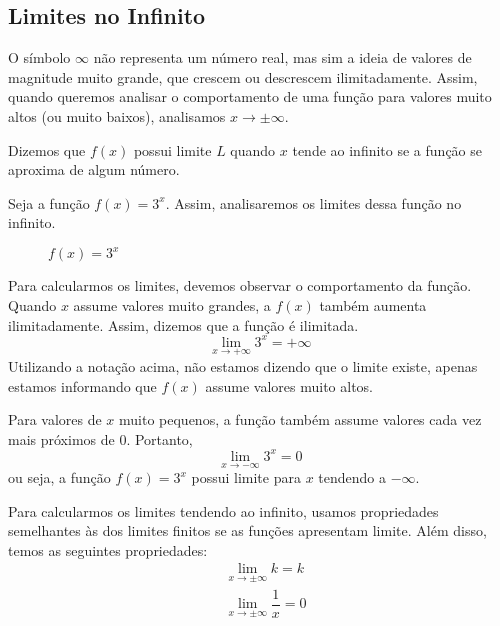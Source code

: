 \subsection{Limites no Infinito}
O símbolo $\infty$ não representa um número real, mas sim a ideia de valores de magnitude muito grande, que crescem ou descrescem ilimitadamente. Assim, quando queremos analisar o comportamento de uma função para valores muito altos (ou muito baixos), analisamos $x \rightarrow \pm \infty$. \par 
Dizemos que $f(x)$ possui limite $L$ quando $x$ tende ao infinito se a função se aproxima de algum número.
\begin{exemplo}
Seja a função $f(x)=3^x$. Assim, analisaremos os limites dessa função no infinito.
\begin{figure}[H]
	\centering
	\caption[Limites no Infinito]{$f(x)=3^x$}
\end{figure}
Para calcularmos os limites, devemos observar o comportamento da função. Quando $x$ assume valores muito grandes, a $f(x)$ também aumenta ilimitadamente. Assim, dizemos que a função é ilimitada.
\[\lim_{x\rightarrow + \infty}3^x = +\infty\]
Utilizando a notação acima, não estamos dizendo que o limite existe, apenas estamos informando que $f(x)$ assume valores muito altos. \par 
Para valores de $x$ muito pequenos, a função também assume valores cada vez mais próximos de $0$. Portanto,
\[\lim_{x\rightarrow - \infty}3^x = 0\]
ou seja, a função $f(x)=3^x$ possui limite para $x$ tendendo a $-\infty$.
\end{exemplo}
Para calcularmos os limites tendendo ao infinito, usamos propriedades semelhantes às dos limites finitos se as funções apresentam limite. Além disso, temos as seguintes propriedades:
\begin{align*}
&\lim_{x\rightarrow \pm \infty}k= k \\
&\lim_{x\rightarrow \pm \infty}\dfrac{1}{x}= 0
\end{align*}

